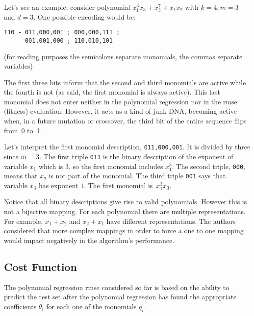 \documentclass[draft,authoryear,3p,times,twocolumn]{elsarticle}
\begin{document}
Let's see an example: consider polynomial $x_1^3 x_3 + x_3^7 + x_1 x_2$ with $k = 4, m = 3$ and $d=3$. One possible encoding would be:
\begin{verbatim}
110 - 011,000,001 ; 000,000,111 ;
      001,001,000 ; 110,010,101
\end{verbatim}


(for reading purposes the semicolons separate monomials, the commas separate variables)

The first three bits inform that the second and third monomials are active while the fourth is not (as said, the first monomial is always active). This last monomial does not enter neither in the polynomial regression nor in the \ac{rmse} (fitness) evaluation. However, it acts as a kind of junk DNA, becoming active when, in a future mutation or crossover, the third bit of the entire sequence flips from~0 to~1.

Let's interpret the first monomial description, \verb!011,000,001!. It is divided by three since $m=3$. The first triple \verb!011! is the binary description of the exponent of variable $x_1$ which is 3, so the first monomial includes $x_1^3$. The second triple, \verb!000!, means that $x_2$ is not part of the monomial. The third triple \verb!001! says that variable $x_3$ has exponent $1$. The first monomial is~$x_1^3 x_3$.

Notice that all binary descriptions give rise to valid polynomials. However this is not a bijective mapping. For each polynomial there are multiple representations. For example, $x_1+x_2$ and $x_2+x_1$ have different representations. The authors considered that more complex mappings in order to force a one to one mapping would impact negatively in the algorithm's performance.


\subsection{Cost Function}\label{subs:cost.function}

The polynomial regression \ac{rmse} considered so far is based on the ability to predict the test set after the polynomial regression has found the appropriate coefficients $\theta_i$ for each one of the monomials $q_i$.
\end{document}
